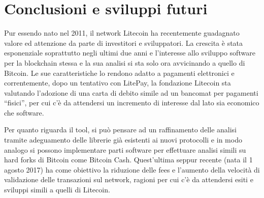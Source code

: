 \chapter{Conclusioni e sviluppi futuri}

Pur essendo nato nel 2011, il network Litecoin ha recentemente guadagnato valore ed attenzione da parte di investitori e sviluppatori. La crescita è stata esponenziale soprattutto negli ultimi due anni e l’interesse allo sviluppo software per la blockchain stessa e la sua analisi si sta solo ora avvicinando a quello di Bitcoin. Le sue caratteristiche lo rendono adatto a pagamenti elettronici e correntemente, dopo un tentativo con LitePay, la fondazione Litecoin sta valutando l’adozione di una carta di debito simile ad un bancomat per pagamenti “fisici”, per cui c’è da attendersi un incremento di interesse dal lato sia economico che software.

Per quanto riguarda il tool, si può pensare ad un raffinamento delle analisi tramite adeguamento delle librerie già esistenti ai nuovi protocolli e in modo analogo si possono implementare parti software per effettuare analisi simili su hard forks di Bitcoin come Bitcoin Cash. Quest’ultima seppur recente (nata il 1 agosto 2017) ha come obiettivo la riduzione delle fees e l’aumento della velocità di validazione delle transazioni sul network, ragioni per cui c’è da attendersi esiti e sviluppi simili a quelli di Litecoin.


